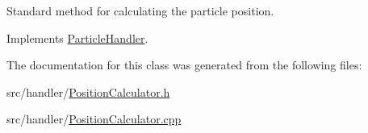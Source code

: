 Standard method for calculating the particle position. 



Implements \hyperlink{classParticleHandler_a95783831b8077d447c95ec5e2627c1fa}{Particle\-Handler}.



The documentation for this class was generated from the following files\-:\begin{DoxyCompactItemize}
\item 
src/handler/\hyperlink{PositionCalculator_8h}{Position\-Calculator.\-h}\item 
src/handler/\hyperlink{PositionCalculator_8cpp}{Position\-Calculator.\-cpp}\end{DoxyCompactItemize}

